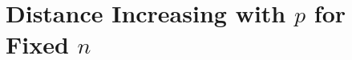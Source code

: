 \documentclass[12]{article}
\begin{document}
%
%







\section{Distance Increasing with $p$ for Fixed $n$} \label{sec:distance}
\end{document}
